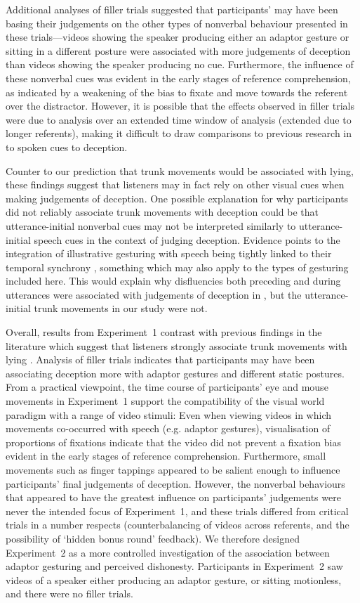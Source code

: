 \documentclass[a4paper,man,natbib]{apa6}
\begin{document}
Additional analyses of filler trials suggested that participants' may have been basing their judgements on the other types of nonverbal behaviour presented in these trials---videos showing the speaker producing either an adaptor gesture or sitting in a different posture were associated with more judgements of deception than videos showing the speaker producing no cue.
Furthermore, the influence of these nonverbal cues was evident in the early stages of reference comprehension, as indicated by a weakening of the bias to fixate and move towards the referent over the distractor. 
However, it is possible that the effects observed in filler trials were due to analysis over an extended time window of analysis (extended due to longer referents), making it difficult to draw comparisons to previous research in to spoken cues to deception. 

Counter to our prediction that trunk movements would be associated with lying, these findings suggest that listeners may in fact rely on other visual cues when making judgements of deception.
One possible explanation for why participants did not reliably associate trunk movements with deception could be that utterance-initial nonverbal cues may not be interpreted similarly to utterance-initial speech cues in the context of judging deception.
Evidence points to the integration of illustrative gesturing with speech being tightly linked to their temporal synchrony \citep[See][]{Habets2011}, something which may also apply to the types of gesturing included here.
This would explain why disfluencies both preceding and during utterances were associated with judgements of deception in \citet{Loy2017}, but the utterance-initial trunk movements in our study were not.

Overall, results from Experiment~1 contrast with previous findings in the literature which suggest that listeners strongly associate trunk movements with lying \citep[e.g.][]{Vrij1996a, Zuckerman1981}.
Analysis of filler trials indicates that participants may have been associating deception more with adaptor gestures and different static postures. 
From a practical viewpoint, the time course of participants' eye  and mouse movements in Experiment~1 support the compatibility of the visual world paradigm with a range of video stimuli: Even when viewing videos in which movements co-occurred with speech (e.g. adaptor gestures), visualisation of proportions of fixations indicate that the video did not prevent a fixation bias evident in the early stages of reference comprehension.
Furthermore, small movements such as finger tappings appeared to be salient enough to influence participants' final judgements of deception.
However, the nonverbal behaviours that appeared to  have the greatest influence on participants' judgements were never the intended focus of Experiment~1, and these trials differed from critical trials in a number respects (counterbalancing of videos across referents, and the possibility of `hidden bonus round' feedback).
We therefore designed Experiment~2 as a more controlled investigation of the association between adaptor gesturing and perceived dishonesty.
Participants in Experiment~2 saw videos of a speaker either producing an adaptor gesture, or sitting motionless, and there were no filler trials.
\end{document}
